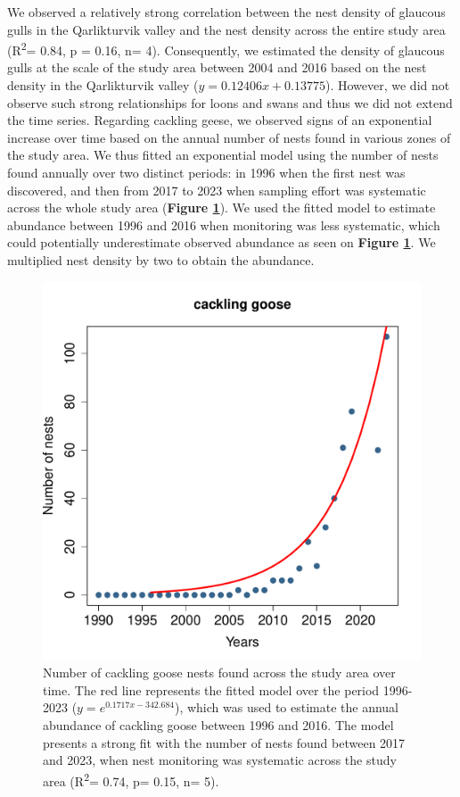 \documentclass[a4paper,twoside,10pt]{article}
\begin{document}
We observed a relatively strong correlation between the nest density of glaucous gulls in the Qarlikturvik valley and the nest density across the entire study area (R\textsuperscript{2}= 0.84, p = 0.16, n= 4). Consequently, we estimated the density of glaucous gulls at the scale of the study area between 2004 and 2016 based on the nest density in the Qarlikturvik valley ($y = 0.12406x + 0.13775$). However, we did not observe such strong relationships for loons and swans and thus we did not extend the time series. Regarding cackling geese, we observed signs of an exponential increase over time based on the annual number of nests found in various zones of the study area. We thus fitted an exponential model using the number of nests found annually over two distinct periods: in 1996 when the first nest was discovered, and then from 2017 to 2023 when sampling effort was systematic across the whole study area (\textbf{Figure \ref{figure:cackling}}). We used the fitted model to estimate abundance between 1996 and 2016 when monitoring was less systematic, which could potentially underestimate observed abundance as seen on \textbf{Figure \ref{figure:cackling}}. We multiplied nest density by two to obtain the abundance. 

\begin{figure}[h]
\centering
\includegraphics[width=0.5\linewidth]{figures/cackling_goose_nest_exponential.pdf} 
\caption{Number of cackling goose nests found across the study area over time. The red line represents the fitted model over the period 1996-2023 ($y= e^{0.1717x-342.684}$), which was used to estimate the annual abundance of cackling goose between 1996 and 2016. The model presents a strong fit with the number of nests found between 2017 and 2023, when nest monitoring was systematic across the study area (R\textsuperscript{2}= 0.74, p= 0.15, n= 5).}
\label{figure:cackling}
\end{figure}
\end{document}
